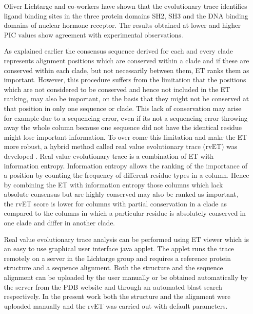 			Oliver Lichtarge and co-workers \parencite{Lichtarge1996} have shown that the evolutionary trace identifies ligand binding sites in the three protein domains SH2, SH3 and the DNA binding domains of nuclear hormone receptor. The results obtained at lower and higher PIC values show agreement with experimental observations. 
		
			As explained earlier the consensus sequence derived for each and every clade represents alignment positions which are conserved within a clade and if these are conserved within each clade, but not necessarily between them, ET ranks them as important. However, this procedure suffers from the limitation that the positions which are not considered to be conserved and hence not included in the ET ranking, may also be important, on the basis that they might not be conserved at that position in only one sequence or clade. This lack of conservation may arise for example due to a sequencing error, even if its not a sequencing error throwing away the whole column because one sequence did not have the identical residue might lose important information. To over come this limitation and make the ET more robust, a hybrid method called real value evolutionary trace (rvET)  was developed \parencite{Mihalek2004}. Real value evolutionary trace is a combination of ET with information entropy. Information entropy allows the ranking of the importance of a position by counting the frequency of different residue types in a column. Hence by combining the ET with information entropy those columns which lack absolute consensus but are highly conserved may also be ranked as important, the rvET score is lower for columns with partial conservation in a clade as compared to the columns in which a particular residue is absolutely conserved in one clade and differ in another clade.
			
			Real value evolutionary trace analysis can be performed using ET viewer \parencite{Morgan2006} which is an easy to use graphical user interface java applet. The applet runs the trace remotely on a server in the Lichtarge group and requires a reference protein structure and a sequence alignment. Both the structure and the sequence alignment can be uploaded by the user manually or be obtained automatically by the server from the PDB website and through an automated blast search respectively. In the present work both the structure and the alignment were uploaded manually and the rvET was carried out with default parameters.
			
